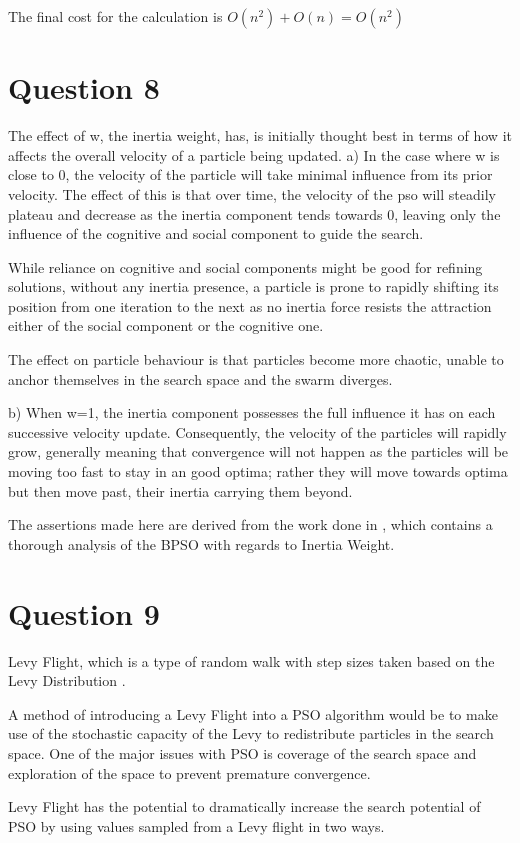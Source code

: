 \documentclass[12pt]{article}
\begin{document}
	The final cost for the calculation is $O(n^2)+O(n)=O(n^2)$
\section{Question 8}
The effect of w, the inertia weight, has, is initially thought best in terms of how it affects the overall velocity of a particle being updated.
	a) In the case where w is close to 0, the velocity of the particle will take minimal influence from its prior velocity. The effect of this is that over time, the velocity of the pso will steadily plateau and decrease as the inertia component tends towards 0, leaving only the influence of the cognitive and social component to guide the search.

	While reliance on cognitive and social components might be good for refining solutions, without any inertia presence, a particle is prone to rapidly shifting its position from one iteration to the next as no inertia force resists the attraction either of the social component or the cognitive one.

	The effect on particle behaviour is that particles become more chaotic, unable to anchor themselves in the search space and the swarm diverges.

	b) When w=1, the inertia component possesses the full influence it has on each successive velocity update. Consequently, the velocity of the particles will rapidly grow, generally meaning that convergence will not happen as the particles will be moving too fast to stay in an good optima; rather they will move towards optima but then move past, their inertia carrying them beyond.

	The assertions made here are derived from the work done in \cite{LiuML16}, which contains a thorough analysis of the BPSO with regards to Inertia Weight.
\section{Question 9}
Levy Flight, which is a type of random walk with step sizes taken based on the Levy Distribution \cite{mandelbrot_1983}.

A method of introducing a Levy Flight into a PSO algorithm would be to make use of the stochastic capacity of the Levy to redistribute particles in the search space. One of the major issues with PSO is coverage of the search space and exploration of the space to prevent premature convergence. 

Levy Flight has the potential to dramatically increase the search potential of PSO by using values sampled from a Levy flight in two ways.
\end{document}

